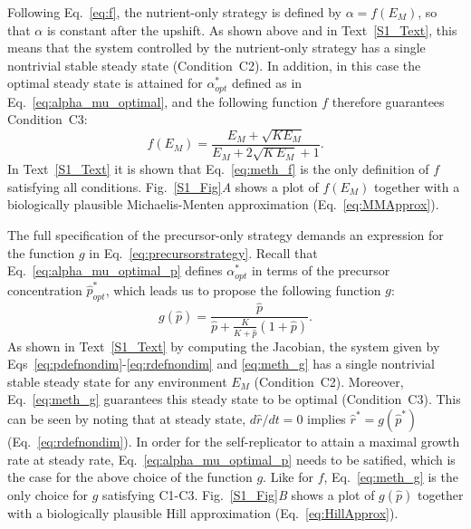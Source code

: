 \documentclass[10pt,letterpaper]{article}
\begin{document}
{Following Eq.~\ref{eq:f}, the nutrient-only strategy is defined by $\alpha = f(E_M)$, so that $\alpha$ is constant after the upshift.
As shown above and in Text~\ref{S1_Text}, this means that the system controlled by the nutrient-only strategy has a single nontrivial stable steady state (Condition~C2). 
In addition, in this case the optimal steady state is attained for $\alpha^*_{opt}$ defined as in Eq.~\ref{eq:alpha_mu_optimal}, and the following function $f$ therefore guarantees Condition~C3:
\begin{equation}
\label{eq:meth_f}
f(E_M) = \frac{E_M + \sqrt{K E_M}}{E_M + 2\sqrt{K\, E_M} + 1}.
\end{equation}
In Text~\ref{S1_Text} it is shown that Eq.~\ref{eq:meth_f} is the only definition of $f$ satisfying all conditions.
Fig.~\ref{S1_Fig}\textit{A} shows a plot of $f(E_M)$ together with a biologically plausible Michaelis-Menten approximation (Eq.~\ref{eq:MMApprox}).

The full specification of the precursor-only strategy demands an expression for the function $g$ in Eq.~\ref{eq:precursorstrategy}.
Recall that Eq.~\ref{eq:alpha_mu_optimal_p} defines $\alpha_{opt}^*$ in terms of the precursor concentration $\hat{p}_{opt}^*$, which leads us to propose the following function $g$:
\begin{equation}
\label{eq:meth_g}
g(\hat{p}) = \frac{\hat{p}}{\hat{p} + \frac{K}{K + \hat{p}}(1+\hat{p})}.
\end{equation}
As shown in Text~\ref{S1_Text} by computing the Jacobian, the system given by Eqs~\ref{eq:pdefnondim}-\ref{eq:rdefnondim} and \ref{eq:meth_g} has a single nontrivial stable steady state for any environment $E_M$ (Condition~C2).
Moreover, Eq.~\ref{eq:meth_g} guarantees this steady state to be optimal (Condition~C3).
This can be seen by noting that at steady state, $d\hat{r}/dt=0$ implies $\hat{r}^*=g(\hat{p}^*)$ (Eq.~\ref{eq:rdefnondim}).
In order for the self-replicator to attain a maximal growth rate at steady rate, Eq.~\ref{eq:alpha_mu_optimal_p} needs to be satified, which is the case for the above choice of the function $g$.
Like for $f$, Eq.~\ref{eq:meth_g} is the only choice for $g$ satisfying C1-C3.
Fig.~\ref{S1_Fig}\textit{B} shows a plot of $g(\hat{p})$ together with a biologically plausible Hill approximation (Eq.~\ref{eq:HillApprox}).

}
\end{document}
